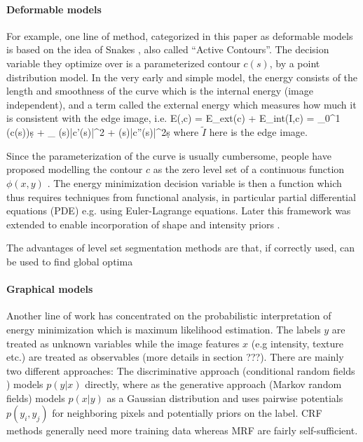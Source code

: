 \documentclass{article} %
\begin{document}
\paragraph{Deformable models}
For example, one line of method, categorized in this paper as deformable models is based on the idea of Snakes \cite{Kass88_Snakes, Cootes92_ActiveShape,Cootes01_ActiveApp, Cootes92_TrainingShape}, also called ``Active Contours''. The decision variable they optimize over is a parameterized contour $c(s)$, by a point distribution model. In the very early and simple model, the energy consists of the length and smoothness of the curve which is the internal energy (image independent), and a term called the external energy which measures how much it is consistent with the edge image, i.e.
\beqs
E(,c) = E_{ext}(c) + E_{int}(I,c) = \int_0^1 (c(s))\d s  + \int_{\Omega} \alpha(s)|c'(s)|^2 + \beta(s)|c''(s)|^2\d s
\eeqs
where $\tilde{I}$ here is the edge image.

Since the parameterization of the curve is usually cumbersome, people have proposed modelling the contour $c$ as the zero level set of a continuous function $\phi(x,y)$ \cite{Leventon00_ShapeGeodesic, ChanVese01, MumfordShah89,Cremers07_Levelreview, Tsai03_MILevelSets}. The energy minimization decision variable is then a function which thus requires techniques from functional analysis, in particular partial differential equations (PDE) e.g. using Euler-Lagrange equations. Later this framework was extended to enable incorporation of shape and intensity priors \cite{Cremers06_KernelDensity, Chan05_LevelShape, Chen09_LevelShapeIntensity}.

The advantages of level set segmentation methods are that, if correctly used, can be used to find global optima 

\paragraph{Graphical models}
Another line of work has concentrated on the probabilistic interpretation of energy minimization which is maximum likelihood estimation. The labels $y$ are treated as unknown variables while the image features $x$ (e.g intensity, texture etc.) are treated as observables (more details in section ???). There are mainly two different approaches: The discriminative approach (conditional random fields \cite{Lafferty01_CRFSeq, KaeSohn13_CRF}) models $p(y|x)$ directly, where as the generative approach (Markov random fields) models $p(x|y)$ as a Gaussian distribution and uses pairwise potentials $p(y_i,y_j)$ for neighboring pixels and potentially priors on the label. CRF methods generally need more training data whereas MRF are fairly self-sufficient.
\end{document}
